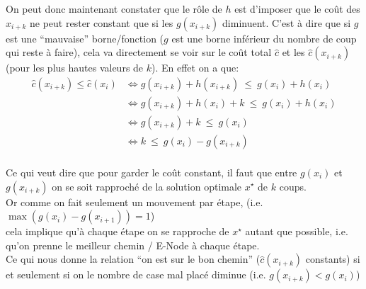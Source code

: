 \documentclass[french]{article}
\newcommand{\quo}[1]{``{#1}''}
\newcommand{\xsol}{x^{\star}}
\begin{document}
\begin{enumerate}[label=(\alph*)]
On peut donc maintenant constater que le rôle de $h$ est d'imposer que le coût des $x_{i+k}$ ne peut rester constant que si les $g(x_{i+k})$ diminuent.
C'est à dire que si $g$ est une \quo{mauvaise} borne/fonction ($g$ est une borne inférieur du nombre de coup qui reste à faire), cela va directement se voir sur le coût total $\hat{c}$ 
et les $\hat{c}(x_{i+k})$ (pour les plus hautes valeurs de $k$). 
En effet on a que: 
\begin{align*}
	\hat{c}(x_{i+k}) \leq \hat{c}(x_i) &\Longleftrightarrow g(x_{i+k}) + h(x_{i+k})\ \leq\ g(x_{i}) + h(x_{i}) \\
	&\Longleftrightarrow g(x_{i+k}) + h(x_{i}) + k\ \leq\ g(x_{i}) + h(x_i)\\
	&\Longleftrightarrow g(x_{i+k}) + k\ \leq\ g(x_{i})\\
	&\Longleftrightarrow k\ \leq\ g(x_{i}) - g(x_{i+k})\\
\end{align*}

Ce qui veut dire que pour garder le coût constant, il faut que entre $g(x_{i})$ et $g(x_{i+k})$ on se soit rapproché de la solution optimale $\xsol$ de $k$ coups.\\
Or comme on fait seulement un mouvement par étape, (i.e. $\max(g(x_i) - g(x_{i+1})) = 1 $)\\
cela implique qu'à chaque étape on se rapproche de $\xsol$ autant que possible, i.e. qu'on prenne le meilleur chemin / E-Node à chaque étape.\\

Ce qui nous donne la relation \quo{on est sur le bon chemin} ($\hat{c}(x_{i+k})$ constants) si et seulement si on le nombre de case mal placé diminue (i.e. $g(x_{i+k}) < g(x_i)$)\\

\end{enumerate}

%
%
\end{document}
